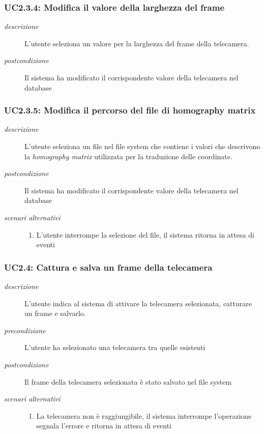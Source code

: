 \subsubsection{UC2.3.4: Modifica il valore della larghezza del frame} \label{sec:UC2.3.4}
\begin{description}
\item[\em{descrizione }]L'utente seleziona un valore per la larghezza del frame della telecamera.
\item[\em{postcondizione }] Il sistema ha modificato il corrispondente valore della telecamera nel database
\end{description}

\subsubsection{UC2.3.5: Modifica il percorso del file di homography matrix} \label{sec:UC2.3.5}
\begin{description}
\item[\em{descrizione }]L'utente seleziona un file nel file system che contiene i valori che descrivono la \textit{homography matrix} utilizzata per la traduzione delle coordinate.
\item[\em{postcondizione }] Il sistema ha modificato il corrispondente valore della telecamera nel database
\item[\em{scenari alternativi }] \mbox{} 
\begin{enumerate} 
\item L'utente interrompe la selezione del file, il sistema ritorna in attesa di eventi
\end{enumerate}
\end{description}

\subsubsection{UC2.4: Cattura e salva un frame della telecamera} \label{sec:UC2.4}
\begin{description}
\item[\em{descrizione }]L'utente indica al sistema di attivare la telecamera selezionata, catturare un frame e salvarlo.
\item[\em{precondizione }] L'utente ha selezionato una telecamera tra quelle esistenti
\item[\em{postcondizione }] Il frame della telecamera selezionata è stato salvato nel file system
\item[\em{scenari alternativi }] \mbox{} 
\begin{enumerate} 
\item La telecamera non è raggiungibile, il sistema interrompe l'operazione segnala l'errore e ritorna in attesa di eventi
\end{enumerate}
\end{description}


